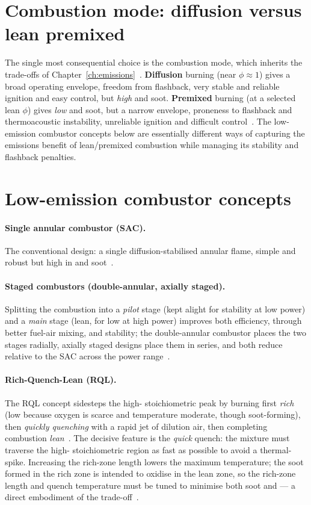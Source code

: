 \section{Combustion mode: diffusion versus lean premixed}

The single most consequential choice is the combustion mode, which inherits the trade-offs of Chapter~\ref{ch:emissions}~\cite{lecture13}. \textbf{Diffusion} burning (near $\phi\approx1$) gives a broad operating envelope, freedom from flashback, very stable and reliable ignition and easy  control, but \emph{high}  and soot. \textbf{Premixed} burning (at a selected lean $\phi$) gives \emph{low}  and soot, but a narrow envelope, proneness to flashback and thermoacoustic instability, unreliable ignition and difficult  control~\cite{lecture13}. The low-emission combustor concepts below are essentially different ways of capturing the emissions benefit of lean/premixed combustion while managing its stability and flashback penalties.

\section{Low-emission combustor concepts}

\paragraph{Single annular combustor (SAC).} The conventional design: a single diffusion-stabilised annular flame, simple and robust but high in  and soot~\cite{lecture13}.

\paragraph{Staged combustors (double-annular, axially staged).} Splitting the combustion into a \emph{pilot} stage (kept alight for stability at low power) and a \emph{main} stage (lean, for low  at high power) improves both efficiency, through better fuel-air mixing, and stability; the double-annular combustor places the two stages radially, axially staged designs place them in series, and both reduce  relative to the SAC across the power range~\cite{lecture13}.

\paragraph{Rich-Quench-Lean (RQL).} The RQL concept sidesteps the high- stoichiometric peak by burning first \emph{rich} (low  because oxygen is scarce and temperature moderate, though soot-forming), then \emph{quickly quenching} with a rapid jet of dilution air, then completing combustion \emph{lean}~\cite{lecture13}. The decisive feature is the \emph{quick} quench: the mixture must traverse the high- stoichiometric region as fast as possible to avoid a thermal- spike. Increasing the rich-zone length lowers the maximum temperature; the soot formed in the rich zone is intended to oxidise in the lean zone, so the rich-zone length and quench temperature must be tuned to minimise both soot and  --- a direct embodiment of the trade-off~\cite{lecture13}.

